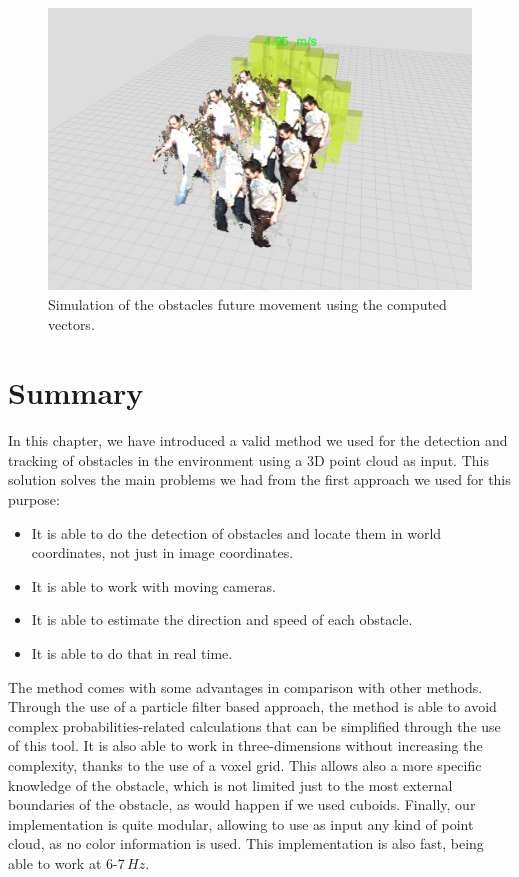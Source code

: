 \begin{figure}[t]
  \centering
  \includegraphics{fakePointCloud}
  \caption{Simulation of the obstacles future movement using the computed vectors.}\label{fig:cp05_obstacle_vectors_computation}
\end{figure}

\FloatBarrier

\section{Summary}\label{ch:chapter05_03}
 
In this chapter, we have introduced a valid method we used for the detection and tracking of obstacles in the environment using a 3D point cloud as input. This solution solves the main problems we had from the first approach we used for this purpose:
\begin{itemize}
 \item It is able to do the detection of obstacles and locate them in world coordinates, not just in image coordinates.
 \item It is able to work with moving cameras.
 \item It is able to estimate the direction and speed of each obstacle.
 \item It is able to do that in real time.
\end{itemize}

The method comes with some advantages in comparison with other methods. Through the use of a particle filter based approach, the method is able to avoid complex probabilities-related calculations that can be simplified through the use of this tool. It is also able to work in three-dimensions without increasing the complexity, thanks to the use of a voxel grid. This allows also a more specific knowledge of the obstacle, which is not limited just to the most external boundaries of the obstacle, as would happen if we used cuboids. Finally, our implementation is quite modular, allowing to use as input any kind of point cloud, as no color information is used. This implementation is also fast, being able to work at 6-7\,$Hz$.

